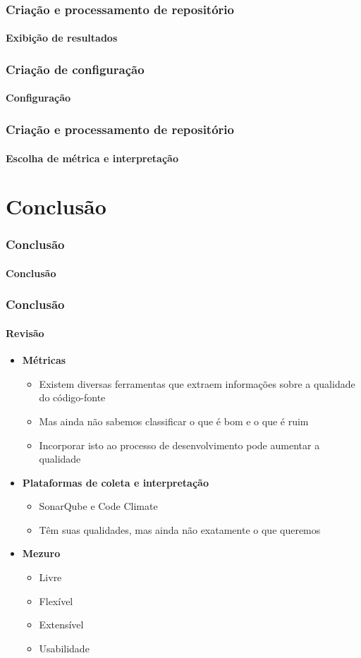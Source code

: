 \documentclass{beamer}
\begin{document}
  \begin{frame}
    \frametitle{Criação e processamento de repositório}
    \framesubtitle{Exibição de resultados}
  \end{frame}

  \begin{frame}
    \frametitle{Criação de configuração}
    \framesubtitle{Configuração}
  \end{frame}

  \begin{frame}
    \frametitle{Criação e processamento de repositório}
    \framesubtitle{Escolha de métrica e interpretação}
  \end{frame}

\section{Conclusão}
\begin{frame}
  \frametitle{Conclusão}
  \framesubtitle{}

  \LARGE{\textbf{Conclusão}}
\end{frame}

\begin{frame}
  \frametitle{Conclusão}
  \framesubtitle{Revisão}

  \begin{itemize}
    \item \textbf{Métricas}
      \begin{itemize}
        \item Existem diversas ferramentas que extraem informações sobre a qualidade do código-fonte
        \item Mas ainda não sabemos classificar o que é bom e o que é ruim
        \item Incorporar isto ao processo de desenvolvimento pode aumentar a qualidade
      \end{itemize}
    \item \textbf{Plataformas de coleta e interpretação}
      \begin{itemize}
        \item SonarQube e Code Climate
        \item Têm suas qualidades, mas ainda não exatamente o que queremos
      \end{itemize}
    \item \textbf{Mezuro}
      \begin{itemize}
        \item Livre
        \item Flexível
        \item Extensível
        \item Usabilidade
      \end{itemize}
  \end{itemize}
\end{frame}
\end{document}
